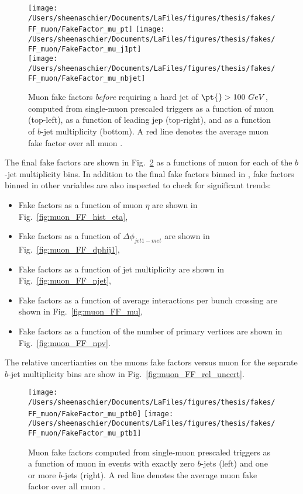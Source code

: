 \documentclass[11pt, oneside]{article}   	%
\begin{document}
\begin{figure}[tbp]
  \centering
  \texttt{[image: /Users/sheenaschier/Documents/LaFiles/figures/thesis/fakes/FF\_muon/FakeFactor\_mu\_pt]}
  \texttt{[image: /Users/sheenaschier/Documents/LaFiles/figures/thesis/fakes/FF\_muon/FakeFactor\_mu\_j1pt]}\\
  \texttt{[image: /Users/sheenaschier/Documents/LaFiles/figures/thesis/fakes/FF\_muon/FakeFactor\_mu\_nbjet]}\\
  \caption{Muon fake factors \textit{before} requiring a hard jet of $\pt{}> 100~GeV$, computed from single-muon prescaled triggers as a function of muon \pt{} (top-left), as a function of leading jep \pt{} (top-right), and as a function of $b$-jet multiplicity (bottom). A red line denotes the average muon fake factor over all muon \pt{}.}
  \label{fig:muon_FF_hist_noCut}
\end{figure}

The final fake factors are shown in Fig.~\ref{fig:muon_FF_hist} as a functions of muon \pt{} for each of the $b$-jet multiplicity bins.  In addition to the final fake factors binned in \pt, fake factors binned in other variables are also inspected to check for significant trends:
\begin{itemize}
\item Fake factors as a function of muon $\eta$ are shown in Fig.~\ref{fig:muon_FF_hist_eta},
\item Fake factors as a function of $\Delta\phi_{jet1-met}$ are shown in Fig.~\ref{fig:muon_FF_dphij1},
\item Fake factors as a function of jet multiplicity are shown in Fig.~\ref{fig:muon_FF_njet},
\item Fake factors as a function of average interactions per bunch crossing are shown in Fig.~\ref{fig:muon_FF_mu},
\item Fake factors as a function of the number of primary vertices are shown in Fig.~\ref{fig:muon_FF_npv}.
\end{itemize}
The relative uncertianties on the muons fake factors versus muon \pt{} for the separate $b$-jet multiplicity bins are show in Fig.~\ref{fig:muon_FF_rel_uncert}.

\begin{figure}[tbp]
  \centering
  \texttt{[image: /Users/sheenaschier/Documents/LaFiles/figures/thesis/fakes/FF\_muon/FakeFactor\_mu\_ptb0]}
  \texttt{[image: /Users/sheenaschier/Documents/LaFiles/figures/thesis/fakes/FF\_muon/FakeFactor\_mu\_ptb1]}\\
  \caption{Muon fake factors computed from single-muon prescaled triggers as a function of muon \pt{} in events with exactly zero $b$-jets (left) and one or more $b$-jets (right). A red line denotes the average muon fake factor over all muon \pt{}.}
  \label{fig:muon_FF_hist}
\end{figure}
\end{document}

